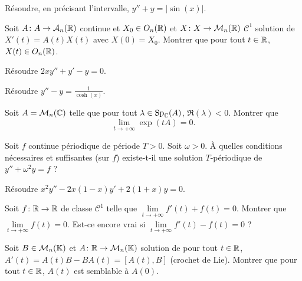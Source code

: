 \documentclass[12pt]{article}
\begin{document}
\begin{exercise}
	Résoudre, en précisant l'intervalle, $y''+y=\left\lvert\sin(x)\right\rvert$.
\end{exercise}

\begin{exercise}
	Soit $A\colon A\to\mathcal{A}_n(\mathbb{R})$ continue et $X_0\in O_n(\mathbb{R})$ et $X\colon X\to\mathcal{M}_n(\mathbb{R})$ $\mathcal{C}^{1}$ solution de $X'(t)=A(t)X(t)$ avec $X(0)=X_0$. Montrer que pour tout $t\in\mathbb{R}$, $X(t)\in O_n(\mathbb{R})$.
\end{exercise}

\begin{exercise}
	Résoudre $2xy''+y'-y=0$.
\end{exercise}

\begin{exercise}
	Résoudre $y''-y=\frac{1}{\cosh(x)}$.
\end{exercise}

\begin{exercise}
	Soit $A=\mathcal{M}_n(\mathbb{C})$ telle que pour tout $\lambda\in\operatorname{Sp}_{\mathbb{C}}(A)$, $\Re(\lambda)<0$. Montrer que 
	\begin{equation*}
		\lim\limits_{t\to+\infty}\exp(tA)=0.
	\end{equation*}
\end{exercise}

\begin{exercise}
	Soit $f$ continue périodique de période $T>0$. Soit $\omega>0$. À quelles conditions nécessaires et suffisantes (sur $f$) existe-t-il une solution $T$-périodique de $y''+\omega^{2}y=f$ ?
\end{exercise}

\begin{exercise}
	Résoudre $x^{2}y''-2x(1-x)y'+2(1+x)y=0$.
\end{exercise}

\begin{exercise}
	Soit $f\colon\mathbb{R}\to\mathbb{R}$ de classe $\mathcal{C}^{1}$ telle que $\lim\limits_{t\to+\infty}f'(t)+f(t)=0$. Montrer que $\lim\limits_{t\to+\infty}f(t)=0$. Est-ce encore vrai si $\lim\limits_{t\to+\infty}f'(t)-f(t)=0$ ?
\end{exercise}

\begin{exercise}
	Soit $B\in\mathcal{M}_n(\mathbb{K})$ et $A\colon\mathbb{R}\to\mathcal{M}_n(\mathbb{K})$ solution de pour tout $t\in\mathbb{R}$, $A'(t)=A(t)B-BA(t)=[A(t),B]$ (crochet de Lie). Montrer que pour tout $t\in\mathbb{R}$, $A(t)$ est semblable à $A(0)$.
\end{exercise}
\end{document}
